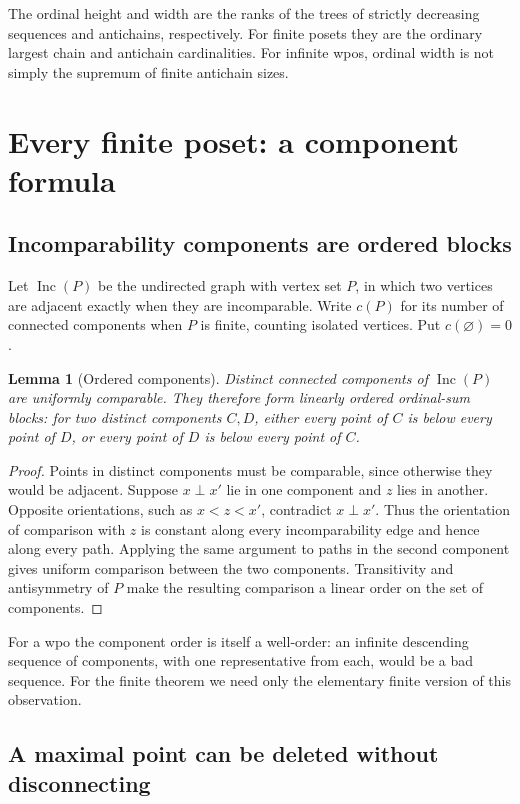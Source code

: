 \documentclass[11pt,letterpaper]{article}
\newtheorem{lemma}[theorem]{Lemma}
\theoremstyle{definition}
\theoremstyle{remark}
\newcommand{\Inc}{\operatorname{Inc}}
\begin{document}
The ordinal height and width are the ranks of the trees of strictly
decreasing sequences and antichains, respectively. For finite posets they
are the ordinary largest chain and antichain cardinalities. For infinite
wpos, ordinal width is not simply the supremum of finite antichain sizes.

\section{Every finite poset: a component formula}\label{sec:finite}

\subsection{Incomparability components are ordered blocks}
Let $\Inc(P)$ be the undirected graph with vertex set $P$, in which two
vertices are adjacent exactly when they are incomparable. Write $c(P)$
for its number of connected components when $P$ is finite, counting
isolated vertices. Put $c(\varnothing)=0$.

\begin{lemma}[Ordered components]\label{lem:ordered-components}
Distinct connected components of $\Inc(P)$ are uniformly comparable.
They therefore form linearly ordered ordinal-sum blocks: for two distinct
components $C,D$, either every point of $C$ is below every point of $D$,
or every point of $D$ is below every point of $C$.
\end{lemma}
\begin{proof}
Points in distinct components must be comparable, since otherwise they
would be adjacent. Suppose $x\perp x'$ lie in one component and $z$ lies
in another. Opposite orientations, such as $x<z<x'$, contradict
$x\perp x'$. Thus the orientation of comparison with $z$ is constant
along every incomparability edge and hence along every path. Applying the
same argument to paths in the second component gives uniform comparison
between the two components. Transitivity and antisymmetry of $P$ make the
resulting comparison a linear order on the set of components.
\end{proof}

For a wpo the component order is itself a well-order: an infinite
descending sequence of components, with one representative from each,
would be a bad sequence. For the finite theorem we need only the elementary
finite version of this observation.

\subsection{A maximal point can be deleted without disconnecting}
\end{document}
